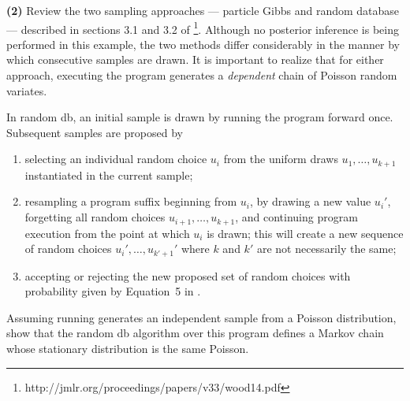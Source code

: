 \documentclass[11pt,reqno]{amsart}
\newif\ifanswers
\newcommand{\+}[1]{\ensuremath{{\mathbf{#1}}}}
\begin{document}
\ifanswers
\begin{quotation}
{\bf Answer:}
\begin{code}{}{}
[assume sample-poisson (lambda (rate) (begin
    (define L (exp (* -1 rate)))
    (define inner-loop (lambda (k p)
        (if (<= p L)
            (dec k)
            (begin
                (define u (uniform-continuous 0 1))
                (inner-loop (inc k) (* p u))))))
    (inner-loop 1 (uniform-continuous 0 1))))]
    
[predict (sample-poisson 4)]
\end{code}
\end{quotation}
\fi

{\bf (2)} 
Review the two sampling approaches --- particle Gibbs and random database --- described in sections 3.1 and 3.2 of \cite{Wood-AISTATS-2014}\footnote{http://jmlr.org/proceedings/papers/v33/wood14.pdf}.
Although no posterior inference is being performed in this example, the two methods differ considerably in the manner by which consecutive samples are drawn.
It is important to realize that for either approach, executing the program generates a {\em dependent} chain of Poisson random variates.


In random db, an initial sample is drawn by running the program forward once.
Subsequent samples are proposed by 
\begin{enumerate}
\item selecting an individual random choice $u_i$ from the uniform draws $u_1, \dots, u_{k+1}$ instantiated in the current sample;
\item resampling a program suffix beginning from $u_i$, by drawing a new value $u_i'$, forgetting all random choices $u_{i+1}, \dots, u_{k+1}$, and continuing program execution from the point at which $u_i$ is drawn; this will create a new sequence of random choices $u_i', \dots, u_{k'+1}'$ where $k$ and $k'$ are not necessarily the same;
\item accepting or rejecting the new proposed set of random choices with probability given by Equation~5 in \cite{Wood-AISTATS-2014}.
\end{enumerate}
Assuming running  generates an independent sample from a Poisson distribution, show that the random db algorithm over this program defines a Markov chain whose stationary distribution is the same Poisson.
\end{document}
